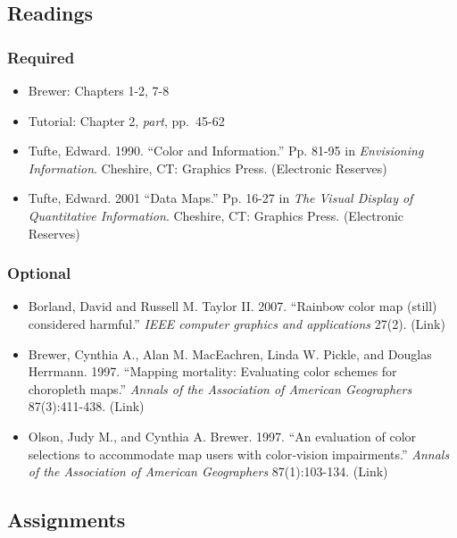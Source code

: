 \documentclass[
]{book}
\providecommand{\tightlist}{%
  \setlength{\itemsep}{0pt}\setlength{\parskip}{0pt}}
\begin{document}
\hypertarget{readings-4}{%
\subsection*{Readings}\label{readings-4}}

\hypertarget{required-3}{%
\subsubsection*{Required}\label{required-3}}

\begin{itemize}
\item
  Brewer: Chapters 1-2, 7-8
\item
  Tutorial: Chapter 2, \emph{part}, pp.~45-62
\item
  Tufte, Edward. 1990. ``Color and Information.'' Pp. 81-95 in \emph{Envisioning Information}. Cheshire, CT: Graphics Press. (Electronic Reserves)
\item
  Tufte, Edward. 2001 ``Data Maps.'' Pp. 16-27 in \emph{The Visual Display of Quantitative Information}. Cheshire, CT: Graphics Press. (Electronic Reserves)
\end{itemize}

\hypertarget{optional-2}{%
\subsubsection*{Optional}\label{optional-2}}

\begin{itemize}
\tightlist
\item
  Borland, David and Russell M. Taylor II. 2007. ``Rainbow color map (still) considered harmful.'' \emph{IEEE computer graphics and applications} 27(2). (Link)
\item
  Brewer, Cynthia A., Alan M. MacEachren, Linda W. Pickle, and Douglas Herrmann. 1997. ``Mapping mortality: Evaluating color schemes for choropleth maps.'' \emph{Annals of the Association of American Geographers} 87(3):411-438. (Link)
\item
  Olson, Judy M., and Cynthia A. Brewer. 1997. ``An evaluation of color selections to accommodate map users with color‐vision impairments.'' \emph{Annals of the Association of American Geographers} 87(1):103-134. (Link)
\end{itemize}

\hypertarget{assignments-4}{%
\subsection*{Assignments}\label{assignments-4}}
\end{document}
